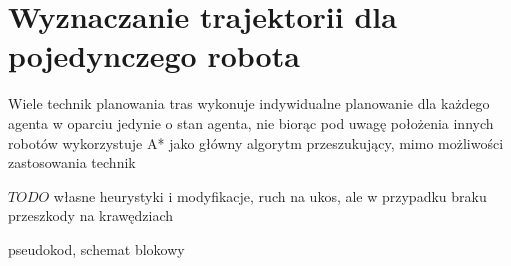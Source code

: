 \section{Wyznaczanie trajektorii dla pojedynczego robota}
\label{ch:alg-single-astar}

Wiele technik planowania tras wykonuje indywidualne planowanie dla każdego agenta w oparciu jedynie o stan agenta, nie biorąc pod uwagę położenia innych robotów  wykorzystuje A* jako główny algorytm przeszukujący, mimo możliwości zastosowania technik 

$TODO$ własne heurystyki i modyfikacje, ruch na ukos, ale w przypadku braku przeszkody na krawędziach

pseudokod, schemat blokowy